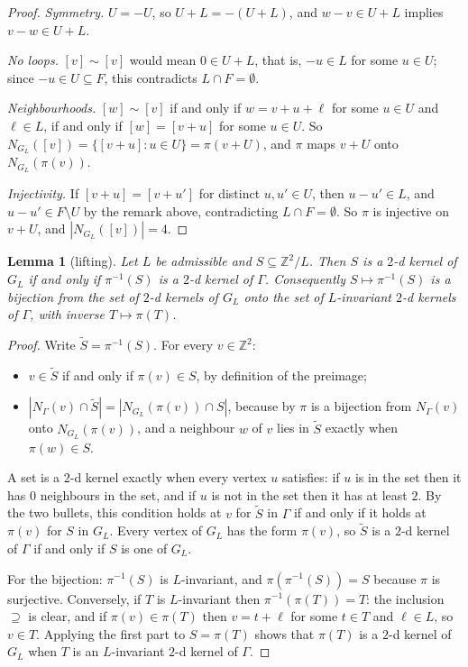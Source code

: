 \documentclass[11pt]{article}
\theoremstyle{plain}
\newtheorem{lemma}[lemma]{Lemma}
\theoremstyle{definition}
\theoremstyle{remark}
\newcommand{\Z}{\mathbb{Z}}
\begin{document}
\begin{proof}
\emph{Symmetry.} $U = -U$, so $U + L = -(U + L)$, and $w - v \in U + L$ implies
$v - w \in U + L$.

\emph{No loops.} $[v] \sim [v]$ would mean $0 \in U + L$, that is, $-u \in L$ for some
$u \in U$; since $-u \in U \subseteq F$, this contradicts $L \cap F = \emptyset$.

\emph{Neighbourhoods.} $[w] \sim [v]$ if and only if $w = v + u + \ell$ for some $u \in U$
and $\ell \in L$, if and only if $[w] = [v + u]$ for some $u \in U$. So
$N_{G_L}([v]) = \{[v + u] : u \in U\} = \pi(v + U)$, and $\pi$ maps $v + U$ onto
$N_{G_L}(\pi(v))$.

\emph{Injectivity.} If $[v + u] = [v + u']$ for distinct $u, u' \in U$, then
$u - u' \in L$, and $u - u' \in F \setminus U$ by the remark above, contradicting
$L \cap F = \emptyset$. So $\pi$ is injective on $v + U$, and $|N_{G_L}([v])| = 4$.
\end{proof}

\begin{lemma}[lifting]\label{lem:lift}
Let $L$ be admissible and $S \subseteq \Z^2/L$. Then $S$ is a $2$-d kernel of $G_L$ if and only
if $\pi^{-1}(S)$ is a $2$-d kernel of $\Gamma$. Consequently $S \mapsto \pi^{-1}(S)$ is a
bijection from the set of $2$-d kernels of $G_L$ onto the set of $L$-invariant $2$-d kernels
of $\Gamma$, with inverse $T \mapsto \pi(T)$.
\end{lemma}

\begin{proof}
Write $\widetilde S = \pi^{-1}(S)$. For every $v \in \Z^2$:
\begin{itemize}
  \item $v \in \widetilde S$ if and only if $\pi(v) \in S$, by definition of the preimage;
  \item $|N_\Gamma(v) \cap \widetilde S| = |N_{G_L}(\pi(v)) \cap S|$, because by
         $\pi$ is a bijection from $N_\Gamma(v)$ onto $N_{G_L}(\pi(v))$,
        and a neighbour $w$ of $v$ lies in $\widetilde S$ exactly when $\pi(w) \in S$.
\end{itemize}
A set is a $2$-d kernel exactly when every vertex $u$ satisfies: if $u$ is in the set then it
has $0$ neighbours in the set, and if $u$ is not in the set then it has at least $2$. By the
two bullets, this condition holds at $v$ for $\widetilde S$ in $\Gamma$ if and only if it
holds at $\pi(v)$ for $S$ in $G_L$. Every vertex of $G_L$ has the form $\pi(v)$, so
$\widetilde S$ is a $2$-d kernel of $\Gamma$ if and only if $S$ is one of $G_L$.

For the bijection: $\pi^{-1}(S)$ is $L$-invariant, and $\pi(\pi^{-1}(S)) = S$ because $\pi$
is surjective. Conversely, if $T$ is $L$-invariant then $\pi^{-1}(\pi(T)) = T$: the inclusion
$\supseteq$ is clear, and if $\pi(v) \in \pi(T)$ then $v = t + \ell$ for some $t \in T$ and
$\ell \in L$, so $v \in T$. Applying the first part to $S = \pi(T)$ shows that $\pi(T)$ is a
$2$-d kernel of $G_L$ when $T$ is an $L$-invariant $2$-d kernel of $\Gamma$.
\end{proof}
\end{document}

